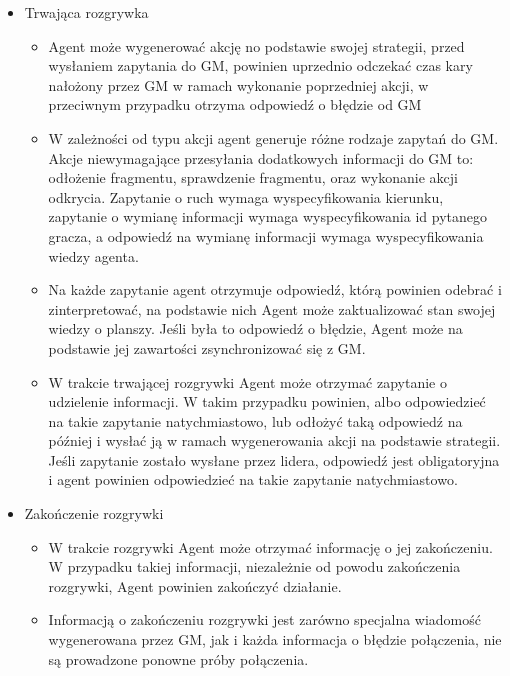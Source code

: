 \documentclass[../Dokumentacja.tex]{subfiles}
\begin{document}
\begin{itemize}
    \item Trwająca rozgrywka
    \begin{itemize}
        \item Agent może wygenerować akcję no podstawie swojej strategii, przed wysłaniem zapytania do GM, powinien uprzednio odczekać czas kary nałożony przez GM w ramach wykonanie poprzedniej akcji, w przeciwnym przypadku otrzyma odpowiedź o błędzie od GM
        \item W zależności od typu akcji agent generuje różne rodzaje zapytań do GM. Akcje niewymagające przesyłania dodatkowych informacji do GM to: odłożenie fragmentu, sprawdzenie fragmentu, oraz wykonanie akcji odkrycia. Zapytanie o ruch wymaga wyspecyfikowania kierunku, zapytanie o wymianę informacji wymaga wyspecyfikowania id pytanego gracza, a odpowiedź na wymianę informacji wymaga wyspecyfikowania wiedzy agenta.
        \item Na każde zapytanie agent otrzymuje odpowiedź, którą powinien odebrać i zinterpretować, na podstawie nich Agent może zaktualizować stan swojej wiedzy o planszy. Jeśli była to odpowiedź o błędzie, Agent może na podstawie jej zawartości zsynchronizować się z GM.
        \item W trakcie trwającej rozgrywki Agent może otrzymać zapytanie o udzielenie informacji. W takim przypadku powinien, albo odpowiedzieć na takie zapytanie natychmiastowo, lub odłożyć taką odpowiedź na później i wysłać ją w ramach wygenerowania akcji na podstawie strategii. Jeśli zapytanie zostało wysłane przez lidera, odpowiedź jest obligatoryjna i agent powinien odpowiedzieć na takie zapytanie natychmiastowo.
    \end{itemize}
    \item Zakończenie rozgrywki
    \begin{itemize}
        \item W trakcie rozgrywki Agent może otrzymać informację o jej zakończeniu. W przypadku takiej informacji, niezależnie od powodu zakończenia rozgrywki, Agent powinien zakończyć działanie.
        \item Informacją o zakończeniu rozgrywki jest zarówno specjalna wiadomość wygenerowana przez GM, jak i każda informacja o błędzie połączenia, nie są prowadzone ponowne próby połączenia.
    \end{itemize}
\end{itemize}
\end{document}
